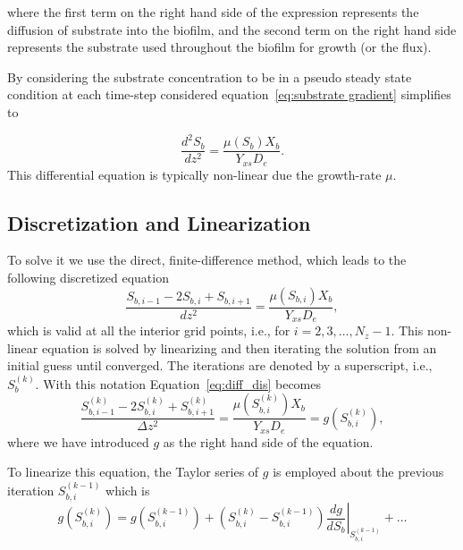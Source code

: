 \documentclass[letterpaper, twoside]{article}
\numberwithin{equation}{section}
\newcommand{\ie}{i.e.}
\begin{document}
where the first term on the right hand side of the expression represents the diffusion of substrate into the biofilm, and the second term on the right hand side represents the substrate used throughout the biofilm for growth (or the flux).

By considering the substrate concentration to be in a pseudo steady state condition at each time-step considered equation~\ref {eq:substrate gradient} simplifies to 

\begin{equation} \label{eq:diffusion}
  \frac{d^2 S_b}{dz^2} = \frac{\mu(S_b) X_b}{Y_{xs} D_e}.
\end{equation}
This differential equation is typically non-linear due the growth-rate $\mu$.

\subsection{Discretization and Linearization}
To solve it we use the direct, finite-difference method, which leads to the following discretized equation
\begin{equation} \label{eq:diff_dis}
  \frac{ S_{b,i-1} - 2 S_{b,i} + S_{b,i+1}}{dz^2} = \frac{\mu(S_{b,i}) X_b}{Y_{xs} D_e},
\end{equation}
which is valid at all the interior grid points, \ie, for $i=2,3,\dots,N_z-1$. 
This non-linear equation is solved by linearizing and then iterating the solution from an initial guess until converged.
The iterations are denoted by a superscript, \ie, $S_{b}^{(k)}$.  With this notation Equation~\ref{eq:diff_dis} becomes
\begin{equation} \label{eq:diff_dis_iter}
  \frac{ S_{b,i-1}^{(k)} - 2 S_{b,i}^{(k)} + S_{b,i+1}^{(k)}}{\Delta z^2} = \frac{\mu\left(S_{b,i}^{(k)}\right) X_b}{Y_{xs} D_e} =  g\left(S_{b,i}^{(k)}\right),
\end{equation}
where we have introduced $g$ as the right hand side of the equation.

To linearize this equation, the Taylor series of $g$ is employed about the previous iteration $S_{b,i}^{(k-1)}$ which is
\begin{equation}\label{eq:TaylorSeries}
  g\left(S_{b,i}^{(k)}\right) =   g\left(S_{b,i}^{(k-1)}\right) + \left( S_{b,i}^{(k)} - S_{b,i}^{(k-1)}\right) \left.\frac{d g}{d S_b}\right|_{S_{b,i}^{(k-1)}} + \dots
\end{equation}
\end{document}
